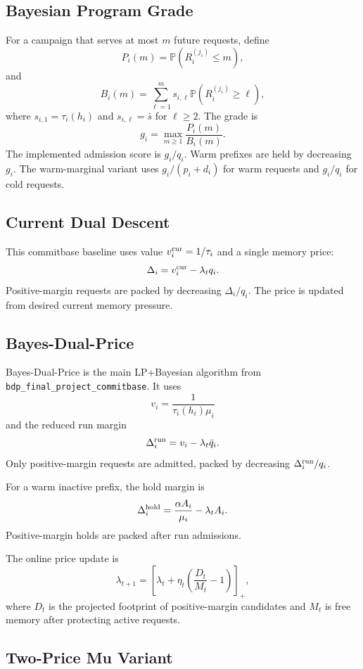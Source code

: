 \documentclass[11pt]{article}
\newcommand{\Prb}{\mathbb P}
\begin{document}
\subsection{Bayesian Program Grade}

For a campaign that serves at most $m$ future requests, define
\[
    P_i(m)=\Prb(R_i^{(j_i)}\le m),
\]
and
\[
    B_i(m)=\sum_{\ell=1}^m s_{i,\ell}\Prb(R_i^{(j_i)}\ge \ell),
\]
where $s_{i,1}=\tau_i(h_i)$ and $s_{i,\ell}=\bar s$ for $\ell\ge2$.  The grade is
\[
    g_i=\max_{m\ge1}\frac{P_i(m)}{B_i(m)}.
\]
The implemented admission score is $g_i/q_i$.  Warm prefixes are held by
decreasing $g_i$.  The warm-marginal variant uses $g_i/(p_i+d_i)$ for warm
requests and $g_i/q_i$ for cold requests.

\subsection{Current Dual Descent}

This commitbase baseline uses value $v_i^{\rm cur}=1/\tau_i$ and a single
memory price:
\[
    \Delta_i=v_i^{\rm cur}-\lambda_t q_i.
\]
Positive-margin requests are packed by decreasing $\Delta_i/q_i$.  The price is
updated from desired current memory pressure.

\subsection{Bayes-Dual-Price}

Bayes-Dual-Price is the main LP+Bayesian algorithm from
\texttt{bdp\_final\_project\_commitbase}.  It uses
\[
    v_i=\frac{1}{\tau_i(h_i)\mu_i}
\]
and the reduced run margin
\[
    \Delta_i^{\rm run}=v_i-\lambda_t\bar q_i.
\]
Only positive-margin requests are admitted, packed by decreasing
$\Delta_i^{\rm run}/q_i$.

For a warm inactive prefix, the hold margin is
\[
    \Delta_i^{\rm hold}=\frac{\alpha A_i}{\mu_i}-\lambda_tA_i.
\]
Positive-margin holds are packed after run admissions.

The online price update is
\[
    \lambda_{t+1}
    =
    \left[
      \lambda_t+\eta_t\left(\frac{D_t}{M_t}-1\right)
    \right]_+,
\]
where $D_t$ is the projected footprint of positive-margin candidates and
$M_t$ is free memory after protecting active requests.

\subsection{Two-Price Mu Variant}
\end{document}
